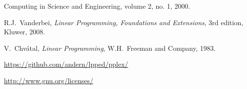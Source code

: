 \documentclass[ukenglish]{nik}
\begin{document}

\begin{thebibliography}{99}
 Computing in Science and Engineering, volume 2, no. 1, 2000.

 R.J.~Vanderbei, 
\emph{Linear Programming, Foundations and Extensions},
3rd edition, Kluwer, 2008.

 V.~Chv\'atal,
\emph{Linear Programming},
W.H.~Freeman and Company, 1983.

\url{https://github.com/andern/lpped/pplex/}

\url{http://www.gnu.org/licenses/}

\end{thebibliography}
\end{document}
